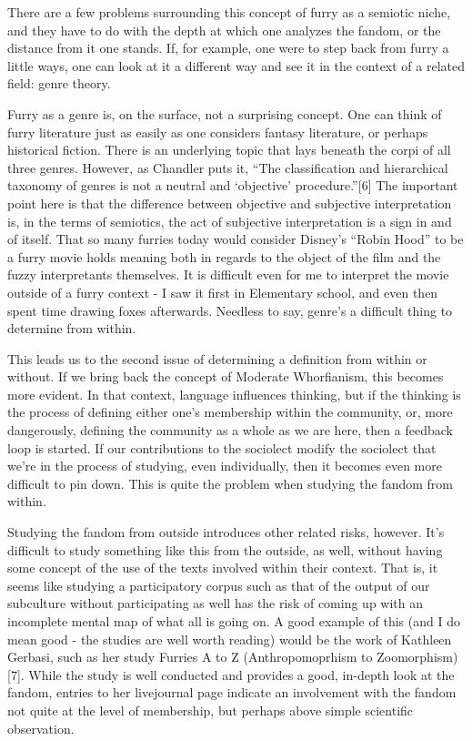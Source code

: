 There are a few problems surrounding this concept of furry as a semiotic niche, and they have to do with the depth at which one analyzes the fandom, or the distance from it one stands. If, for example, one were to step back from furry a little ways, one can look at it a different way and see it in the context of a related field: genre theory.

Furry as a genre is, on the surface, not a surprising concept. One can think of furry literature just as easily as one considers fantasy literature, or perhaps historical fiction. There is an underlying topic that lays beneath the corpi of all three genres. However, as Chandler puts it, ``The classification and hierarchical taxonomy of genres is not a neutral and `objective' procedure.''{[}6{]} The important point here is that the difference between objective and subjective interpretation is, in the terms of semiotics, the act of subjective interpretation is a sign in and of itself. That so many furries today would consider Disney's ``Robin Hood'' to be a furry movie holds meaning both in regards to the object of the film and the fuzzy interpretants themselves. It is difficult even for me to interpret the movie outside of a furry context - I saw it first in Elementary school, and even then spent time drawing foxes afterwards. Needless to say, genre's a difficult thing to determine from within.

This leads us to the second issue of determining a definition from within or without. If we bring back the concept of Moderate Whorfianism, this becomes more evident. In that context, language influences thinking, but if the thinking is the process of defining either one's membership within the community, or, more dangerously, defining the community as a whole as we are here, then a feedback loop is started. If our contributions to the sociolect modify the sociolect that we're in the process of studying, even individually, then it becomes even more difficult to pin down. This is quite the problem when studying the fandom from within.

Studying the fandom from outside introduces other related risks, however. It's difficult to study something like this from the outside, as well, without having some concept of the use of the texts involved within their context. That is, it seems like studying a participatory corpus such as that of the output of our subculture without participating as well has the risk of coming up with an incomplete mental map of what all is going on. A good example of this (and I do mean good - the studies are well worth reading) would be the work of Kathleen Gerbasi, such as her study Furries A to Z (Anthropomoprhism to Zoomorphism){[}7{]}. While the study is well conducted and provides a good, in-depth look at the fandom, entries to her livejournal page indicate an involvement with the fandom not quite at the level of membership, but perhaps above simple scientific observation.

